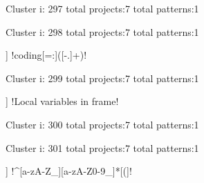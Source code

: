 Cluster i: 297
total projects:7
total patterns:1
\begin{multicols}{1}
\end{multicols}







Cluster i: 298
total projects:7
total patterns:1
\begin{multicols}{1}
\begin{description}[noitemsep,topsep=0pt]
\item [[7] ] \cverb!coding[=:]\s*([-\w.]+)!
\end{description}
\end{multicols}







Cluster i: 299
total projects:7
total patterns:1
\begin{multicols}{1}
\begin{description}[noitemsep,topsep=0pt]
\item [[7] ] \cverb!Local variables in frame!
\end{description}
\end{multicols}







Cluster i: 300
total projects:7
total patterns:1
\begin{multicols}{1}
\begin{description}[noitemsep,topsep=0pt]
\item [[7] ] \cverb!\\hackscore\s*{[^}]*}!
\end{description}
\end{multicols}







Cluster i: 301
total projects:7
total patterns:1
\begin{multicols}{1}
\begin{description}[noitemsep,topsep=0pt]
\item [[7] ] \cverb!^[a-zA-Z_][a-zA-Z0-9_]*[(]!
\end{description}
\end{multicols}







